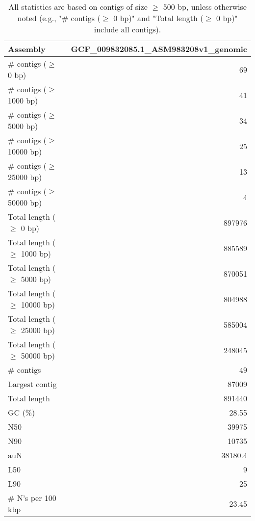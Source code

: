 \documentclass[12pt,a4paper]{article}
\begin{document}
\begin{table}[ht]
\begin{center}
\caption{All statistics are based on contigs of size $\geq$ 500 bp, unless otherwise noted (e.g., "\# contigs ($\geq$ 0 bp)" and "Total length ($\geq$ 0 bp)" include all contigs).}
\begin{tabular}{|l*{1}{|r}|}
\hline
Assembly & GCF\_009832085.1\_ASM983208v1\_genomic \\ \hline
\# contigs ($\geq$ 0 bp) & 69 \\ \hline
\# contigs ($\geq$ 1000 bp) & 41 \\ \hline
\# contigs ($\geq$ 5000 bp) & 34 \\ \hline
\# contigs ($\geq$ 10000 bp) & 25 \\ \hline
\# contigs ($\geq$ 25000 bp) & 13 \\ \hline
\# contigs ($\geq$ 50000 bp) & 4 \\ \hline
Total length ($\geq$ 0 bp) & 897976 \\ \hline
Total length ($\geq$ 1000 bp) & 885589 \\ \hline
Total length ($\geq$ 5000 bp) & 870051 \\ \hline
Total length ($\geq$ 10000 bp) & 804988 \\ \hline
Total length ($\geq$ 25000 bp) & 585004 \\ \hline
Total length ($\geq$ 50000 bp) & 248045 \\ \hline
\# contigs & 49 \\ \hline
Largest contig & 87009 \\ \hline
Total length & 891440 \\ \hline
GC (\%) & 28.55 \\ \hline
N50 & 39975 \\ \hline
N90 & 10735 \\ \hline
auN & 38180.4 \\ \hline
L50 & 9 \\ \hline
L90 & 25 \\ \hline
\# N's per 100 kbp & 23.45 \\ \hline
\end{tabular}
\end{center}
\end{table}
\end{document}
